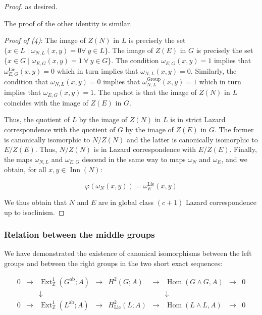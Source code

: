 \documentclass{ucetd}
\begin{document}
\begin{proof}
  as desired.

  The proof of the other identity is similar.

  {\em Proof of (4)}: The image of $Z(N)$ in $L$ is precisely the set
  $\{x \in L \mid \omega_{N,L}(x,y) = 0 \forall \ y \in L \}$. The
  image of $Z(E)$ in $G$ is precisely the set $\{ x \in G \mid
  \omega_{E,G}(x,y) = 1 \ \forall \ y \in G \}$. The condition
  $\omega_{E,G}(x,y) = 1$ implies that $\omega_{E,G}^{\text{Lie}}(x,y)
  = 0$ which in turn implies that $\omega_{N,L}(x,y) = 0$. Similarly,
  the condition that $\omega_{N,L}(x,y) = 0$ implies that
  $\omega_{N,L}^{\text{Group}}(x,y) = 1$ which in turn implies that
  $\omega_{E,G}(x,y) = 1$. The upshot is that the image of $Z(N)$ in
  $L$ coincides with the image of $Z(E)$ in $G$.

  Thus, the quotient of $L$ by the image of $Z(N)$ in $L$ is in strict
  Lazard correspondence with the quotient of $G$ by the image of
  $Z(E)$ in $G$. The former is canonically isomorphic to $N/Z(N)$ and
  the latter is canonically isomorphic to $E/Z(E)$. Thus, $N/Z(N)$ is
  in Lazard correspondence with $E/Z(E)$. Finally, the maps
  $\omega_{N,L}$ and $\omega_{E,G}$ descend in the same way to maps
  $\omega_N$ and $\omega_E$, and we obtain, for all $x,y \in
  \operatorname{Inn}(N)$:

  $$\varphi(\omega_N(x,y)) = \omega_E^{\text{Lie}}(x,y)$$

  We thus obtain that $N$ and $E$ are in global class $(c+1)$ Lazard
  correspondence up to isoclinism.
\end{proof}

\subsubsection{Relation between the middle groups}\label{sec:glcuti-extensions-splitting}

We have demonstrated the existence of canonical isomorphisms between
the left groups and between the right groups in the two short exact
sequences:

$$\begin{array}{ccccccccc}
  0 &\to &\operatorname{Ext}^1_{\mathbb{Z}}(G^{\operatorname{ab}};A) &\to &H^2(G;A) &\to &\operatorname{Hom}(G \wedge G,A) &\to &0\\
  & & \downarrow & & & & \downarrow & & \\
  0 &\to &\operatorname{Ext}^1_{\mathbb{Z}}(L^{\operatorname{ab}};A) & \to & H^2_{\text{Lie}}(L;A) & \to & \operatorname{Hom}(L \wedge L, A) & \to & 0\\
\end{array}$$
\end{document}
